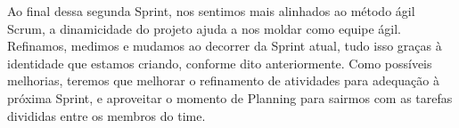 \documentclass[12pt]{article}
\begin{document}
Ao final dessa segunda Sprint, nos sentimos mais alinhados ao método ágil Scrum, a dinamicidade do projeto ajuda a nos moldar como equipe ágil. Refinamos, medimos e mudamos ao decorrer da Sprint atual, tudo isso graças à identidade que estamos criando, conforme dito anteriormente. Como possíveis melhorias, teremos que melhorar o refinamento de atividades para adequação à próxima Sprint, e aproveitar o momento de Planning para sairmos com as tarefas divididas entre os membros do time.



\end{document}
